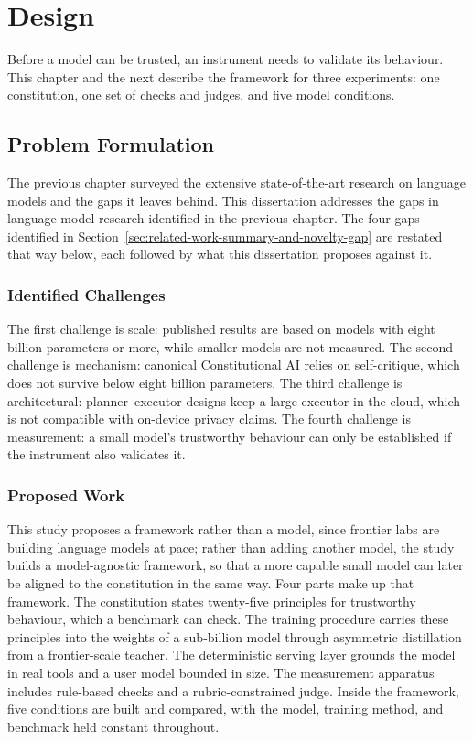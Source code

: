 \chapter{Design}
\label{chap:design}
\label{chap:methodology}

Before a model can be trusted, an instrument needs to validate its behaviour. This chapter and the next describe the framework for three experiments: one constitution, one set of checks and judges, and five model conditions.

\section{Problem Formulation}
\label{sec:problem-formulation}

The previous chapter surveyed the extensive state-of-the-art research on language models and the gaps it leaves behind. This dissertation addresses the gaps in language model research identified in the previous chapter. The four gaps identified in Section~\ref{sec:related-work-summary-and-novelty-gap} are restated that way below, each followed by what this dissertation proposes against it.

\subsection{Identified Challenges}
\label{subsec:identified-challenges}

The first challenge is scale: published results are based on models with eight billion parameters or more, while smaller models are not measured. The second challenge is mechanism: canonical Constitutional AI relies on self-critique, which does not survive below eight billion parameters. The third challenge is architectural: planner--executor designs keep a large executor in the cloud, which is not compatible with on-device privacy claims. The fourth challenge is measurement: a small model's trustworthy behaviour can only be established if the instrument also validates it.

\subsection{Proposed Work}
\label{subsec:proposed-work}

This study proposes a framework rather than a model, since frontier labs are building language models at pace; rather than adding another model, the study builds a model-agnostic framework, so that a more capable small model can later be aligned to the constitution in the same way. Four parts make up that framework. The constitution states twenty-five principles for trustworthy behaviour, which a benchmark can check. The training procedure carries these principles into the weights of a sub-billion model through asymmetric distillation from a frontier-scale teacher. The deterministic serving layer grounds the model in real tools and a user model bounded in size. The measurement apparatus includes rule-based checks and a rubric-constrained judge. Inside the framework, five conditions are built and compared, with the model, training method, and benchmark held constant throughout.

